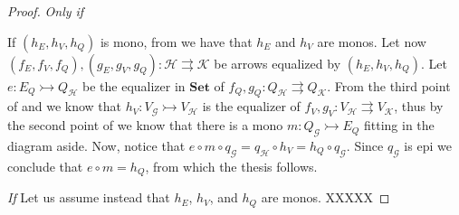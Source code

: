 \documentclass[a4paper,UKenglish,cleveref,pdftex,thm-restate,numberwithinsect]{lipics-v2021}
\newcommand{\Set}{\mathbf{Set}}
\newcommand{\mto}{\rightarrowtail}
\begin{document}
\mn*

\begin{proof}
\emph{Only if}

	\parbox{11cm}{	If $(h_E, h_V, h_Q)$ is mono, from  we have that $h_E$ and $h_V$ are monos. 
	Let now $(f_E, f_V, f_Q), (g_E, g_V, g_Q): \mathcal{H\rightrightarrows K}$ be arrows equalized by $(h_E, h_V, h_Q)$. Let $e\colon E_Q\mto Q_{\mathcal{H}}$ be the equalizer in
	$\Set$ of $f_Q, g_Q\colon Q_{\mathcal{H}}\rightrightarrows Q_{\mathcal{K}}$. From the third point of  and  we know that $h_V\colon V_{\mathcal{G}}\mto V_{\mathcal{H}} $ 
	is the equalizer of $f_V, g_V\colon V_{\mathcal{H}}\rightrightarrows V_{\mathcal{K}}$, thus by the second point of  we know that there is a mono 
	$m\colon Q_{\mathcal{G}}\mto E_Q$ fitting in the diagram aside. Now, notice that 
	$e\circ m\circ q_{\mathcal{G}}=q_\mathcal{H}\circ h_V=h_{Q}\circ q_{\mathcal{G}}$.
	Since $q_{\mathcal{G}}$ is epi we conclude that $e\circ m=h_Q$, from which the thesis follows.}
	\hfill
	\parbox{2cm}{}   
	
	\noindent
	\emph{If}
	Let us assume instead that $h_E$, $h_V$, and $h_Q$  are monos. XXXXX
\end{proof}
\end{document}

